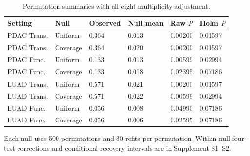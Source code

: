 \begin{table}[!tbp]
\centering\small
\caption{Permutation summaries with all-eight multiplicity adjustment.}\label{tab:validation-summary}
\begin{tabularx}{\textwidth}{p{}p{}YYYY}\toprule
Setting & Null & Observed & Null mean & Raw $P$ & Holm $P$ \\ \midrule
PDAC Trans. & Uniform & 0.364 & 0.013 & 0.00200 & 0.01597 \\
PDAC Trans. & Coverage & 0.364 & 0.020 & 0.00200 & 0.01597 \\
PDAC Func. & Uniform & 0.133 & 0.013 & 0.00599 & 0.02994 \\
PDAC Func. & Coverage & 0.133 & 0.018 & 0.02395 & 0.07186 \\
LUAD Trans. & Uniform & 0.571 & 0.021 & 0.00200 & 0.01597 \\
LUAD Trans. & Coverage & 0.571 & 0.022 & 0.00599 & 0.02994 \\
LUAD Func. & Uniform & 0.056 & 0.008 & 0.04990 & 0.07186 \\
LUAD Func. & Coverage & 0.056 & 0.006 & 0.02595 & 0.07186 \\
\bottomrule\end{tabularx}
\parbox{\textwidth}{\footnotesize Each null uses 500 permutations and 30 refits per permutation. Within-null four-test corrections and conditional recovery intervals are in Supplement S1--S2.}
\end{table}
